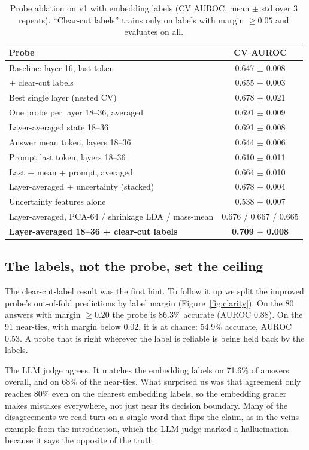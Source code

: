 \documentclass[11pt]{article}
\begin{document}
\begin{table}[t]
  \centering\small
  \caption{Probe ablation on v1 with embedding labels (CV AUROC, mean $\pm$ std over 3 repeats). ``Clear-cut labels'' trains only on labels with margin $\geq 0.05$ and evaluates on all.}
  \label{tab:ablation}
  \begin{tabular}{lc}
    \toprule
    Probe & CV AUROC \\
    \midrule
    Baseline: layer 16, last token & 0.647 $\pm$ 0.008 \\
    \quad + clear-cut labels & 0.655 $\pm$ 0.003 \\
    Best single layer (nested CV) & 0.678 $\pm$ 0.021 \\
    One probe per layer 18--36, averaged & 0.691 $\pm$ 0.009 \\
    Layer-averaged state 18--36 & 0.691 $\pm$ 0.008 \\
    Answer mean token, layers 18--36 & 0.644 $\pm$ 0.006 \\
    Prompt last token, layers 18--36 & 0.610 $\pm$ 0.011 \\
    Last + mean + prompt, averaged & 0.664 $\pm$ 0.010 \\
    Layer-averaged + uncertainty (stacked) & 0.678 $\pm$ 0.004 \\
    Uncertainty features alone & 0.538 $\pm$ 0.007 \\
    Layer-averaged, PCA-64 / shrinkage LDA / mass-mean & 0.676 / 0.667 / 0.665 \\
    \textbf{Layer-averaged 18--36 + clear-cut labels} & \textbf{0.709 $\pm$ 0.008} \\
    \bottomrule
  \end{tabular}
\end{table}

\subsection{The labels, not the probe, set the ceiling}
\label{sec:labels}
The clear-cut-label result was the first hint. To follow it up we split the improved probe's out-of-fold predictions by label margin (Figure~\ref{fig:clarity}). On the 80 answers with margin $\geq 0.20$ the probe is 86.3\% accurate (AUROC 0.88). On the 91 near-ties, with margin below 0.02, it is at chance: 54.9\% accurate, AUROC 0.53. A probe that is right wherever the label is reliable is being held back by the labels.

The LLM judge agrees. It matches the embedding labels on 71.6\% of answers overall, and on 68\% of the near-ties. What surprised us was that agreement only reaches 80\% even on the clearest embedding labels, so the embedding grader makes mistakes everywhere, not just near its decision boundary. Many of the disagreements we read turn on a single word that flips the claim, as in the veins example from the introduction, which the LLM judge marked a hallucination because it says the opposite of the truth.
\end{document}
